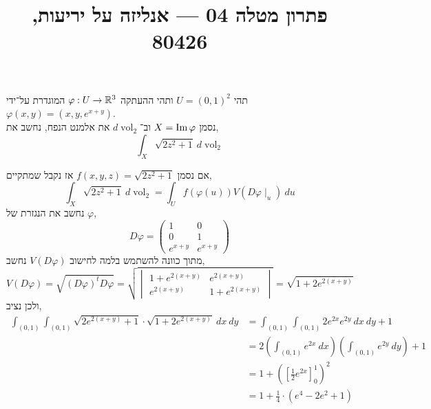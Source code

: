 
\title{פתרון מטלה 04 --- אנליזה על יריעות, 80426}

\DeclareMathOperator{\vol}{vol}


\maketitle
\maketitleprint{}

\question{}
תהי $U = {(0, 1)}^2$ ותהי ההעתקה $\varphi : U \to \mathbb{R}^3$ המוגדרת על־ידי $\varphi(x, y) = (x, y, e^{x + y})$. \\
נסמן $X = \operatorname{Im} \varphi$ וב־$d \vol_2$ את אלמנט הנפח, נחשב את,
\[
	\int_X \sqrt{2z^2 + 1}\ d\vol_2
\]
\begin{solution}
	אם נסמן $f(x, y, z) = \sqrt{2z^2 + 1}$ אז נקבל שמתקיים,
	\[
		\int_X \sqrt{2z^2 + 1}\ d\vol_2
		= \int_U f(\varphi(u)) V(D \varphi \mid_u)\ du
	\]
	נחשב את הנגזרת של $\varphi$,
	\[
		D\varphi
		= \begin{pmatrix}
			1 & 0 \\
			0 & 1 \\
			e^{x + y} & e^{x + y}
		\end{pmatrix} 
	\]
	מתוך כוונה להשתמש בלמה לחישוב $V(D \varphi)$ נחשב,
	\[
		V(D\varphi)
		= \sqrt{{(D\varphi)}^t D \varphi}
		= \sqrt{\begin{vmatrix}
				1 + e^{2 {(x + y)}} & e^{2 {(x + y)}} \\
				e^{2 {(x + y)}} & 1 + e^{2 {(x + y)}}
		\end{vmatrix}}
		= \sqrt{1 + 2e^{2 {(x + y)}}}
	\]
	ולכן נציב,
	\begin{align*}
		\int_{(0, 1)} \int_{(0, 1)} \sqrt{2 e^{2 {(x + y)}} + 1} \cdot \sqrt{1 + 2 e^{2 {(x + y)}}}\ dx\ dy
		& = \int_{(0, 1)} \int_{(0, 1)} 2 e^{2x} e^{2y}\ dx\ dy + 1 \\
		& = 2 \left( \int_{(0, 1)} e^{2x}\ dx \right) \left( \int_{(0, 1)} e^{2y}\ dy \right) + 1 \\
		& = 1 + {\left( {\left[ \frac{1}{2} e^{2x} \right]}_0^1 \right)}^2 \\
		& = 1 + \frac{1}{4} \cdot (e^4 - 2e^2 + 1)
	\end{align*}
\end{solution}

